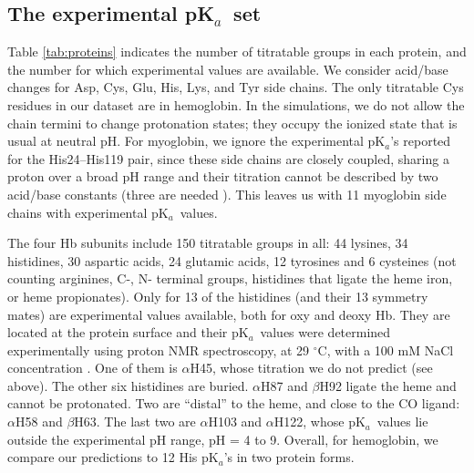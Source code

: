 \documentclass[a4paper,12pt]{article}
\newcommand{\pk}{pK$_a$}
\begin{document}
\subsection{The experimental \pk\ set}
Table \ref{tab:proteins} indicates the number of titratable groups in each protein, and the number for which experimental
values are available. We consider acid/base changes for Asp, Cys, Glu, His, Lys, and Tyr side chains. The only titratable
Cys residues in our dataset are in hemoglobin. In the simulations, we do not allow the chain termini to change
protonation states; they occupy the ionized state that is usual at neutral pH. For myoglobin, we ignore the experimental
\pk's reported for the His24--His119 pair, since these side chains are closely coupled, sharing a proton over a broad
pH range and their titration cannot be described by two acid/base constants (three are needed \cite{Polydorides13}).
This leaves us with 11 myoglobin side chains with experimental \pk\ values.

The four Hb subunits include 150 titratable groups in all: 44 lysines, 34 histidines, 30 aspartic acids, 24 glutamic
acids, 12 tyrosines and 6 cysteines (not counting arginines, C-, N- terminal groups, histidines that ligate the heme
iron, or heme propionates). Only for 13 of the histidines (and their 13 symmetry mates) are experimental values available,
both for oxy and deoxy Hb. They are located at the protein surface and their \pk\ values were determined experimentally 
using proton NMR spectroscopy, at 29 $^{\circ}$C, with a 100 mM NaCl concentration \cite{Fang99}. One of them is $\alpha$H45,
whose titration we do not predict (see above). The other six histidines are buried. $\alpha$H87 and $\beta$H92 ligate
the heme and cannot be protonated. Two are ``distal'' to the heme, and close to the CO ligand: $\alpha$H58 and $\beta$H63.
The last two are $\alpha$H103 and $\alpha$H122, whose \pk\ values lie outside the experimental pH range, pH = 4 to 9.
Overall, for hemoglobin, we compare our predictions to 12 His \pk's in two protein forms.
\end{document}
